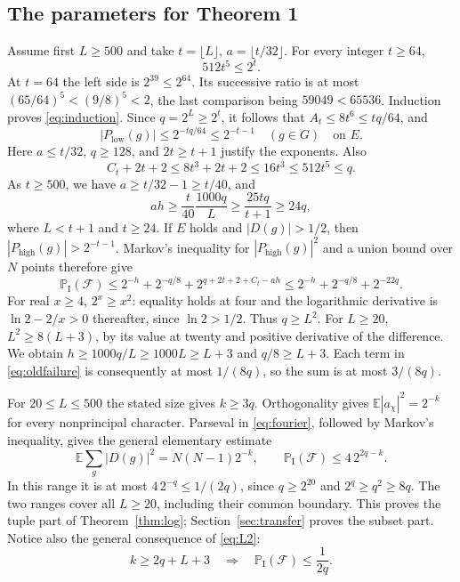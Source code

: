 \documentclass[11pt]{amsart}
\theoremstyle{remark}
\newcommand{\E}{\mathbb E}
\newcommand{\PI}{\mathbb P_{\mathrm I}}
\newcommand{\Fail}{\mathcal F}
\newcommand{\lo}{P_{\mathrm{low}}}
\newcommand{\hi}{P_{\mathrm{high}}}
\begin{document}
\subsection{The parameters for Theorem 1}
Assume first $L\ge500$ and take $t=\lfloor L\rfloor$,
$a=\lfloor t/32\rfloor$. For every integer $t\ge64$,
\begin{equation}\label{eq:induction}
 512t^5\le2^t.
\end{equation}
At $t=64$ the left side is $2^{39}\le2^{64}$. Its successive ratio
is at most $(65/64)^5<(9/8)^5<2$, the last comparison being
$59049<65536$. Induction proves \eqref{eq:induction}. Since
$q=2^L\ge2^t$, it follows that $A_t\le8t^6\le tq/64$, and
\[
 |\lo(g)|\le2^{-tq/64}\le2^{-t-1}\quad(g\in G)\quad\text{on }E.
\]
Here $a\le t/32$, $q\ge128$, and $2t\ge t+1$ justify the exponents.
Also
\[
 C_t+2t+2\le8t^3+2t+2\le16t^3\le512t^5\le q.
\]
As $t\ge500$, we have $a\ge t/32-1\ge t/40$, and
\[
 ah\ge\frac{t}{40}\frac{1000q}{L}
 \ge\frac{25tq}{t+1}\ge24q,
\]
where $L<t+1$ and $t\ge24$. If $E$ holds and $|D(g)|>1/2$,
then $|\hi(g)|>2^{-t-1}$. Markov's inequality for $|\hi(g)|^2$
and a union bound over $N$ points therefore give
\begin{equation}\label{eq:oldfailure}
 \PI(\Fail)\le2^{-h}+2^{-q/8}
       +2^{q+2t+2+C_t-ah}
 \le2^{-h}+2^{-q/8}+2^{-22q}.
\end{equation}
For real $x\ge4$, $2^x\ge x^2$: equality holds at four and the
logarithmic derivative is $\ln2-2/x>0$ thereafter, since
$\ln2>1/2$. Thus $q\ge L^2$. For $L\ge20$,
$L^2\ge8(L+3)$, by its value at twenty and positive derivative of
the difference. We obtain $h\ge1000q/L\ge1000L\ge L+3$ and
$q/8\ge L+3$. Each term in \eqref{eq:oldfailure} is consequently
at most $1/(8q)$, so the sum is at most $3/(8q)$.

For $20\le L\le500$ the stated size gives $k\ge3q$. Orthogonality
gives $\E|a_\chi|^2=2^{-k}$ for every nonprincipal character. Parseval
in \eqref{eq:fourier}, followed by Markov's inequality, gives the
general elementary estimate
\begin{equation}\label{eq:L2}
 \E\sum_g|D(g)|^2=N(N-1)2^{-k},\qquad
 \PI(\Fail)\le4\,2^{2q-k}.
\end{equation}
In this range it is at most $4\,2^{-q}\le1/(2q)$, since
$q\ge2^{20}$ and $2^q\ge q^2\ge8q$. The two ranges cover all
$L\ge20$, including their common boundary. This proves the tuple
part of Theorem~\ref{thm:log}; Section~\ref{sec:transfer} proves the
subset part. Notice also the general consequence of \eqref{eq:L2}:
\begin{equation}\label{eq:benchmark}
 k\ge2q+L+3\quad\Longrightarrow\quad\PI(\Fail)\le\frac1{2q}.
\end{equation}
\end{document}
